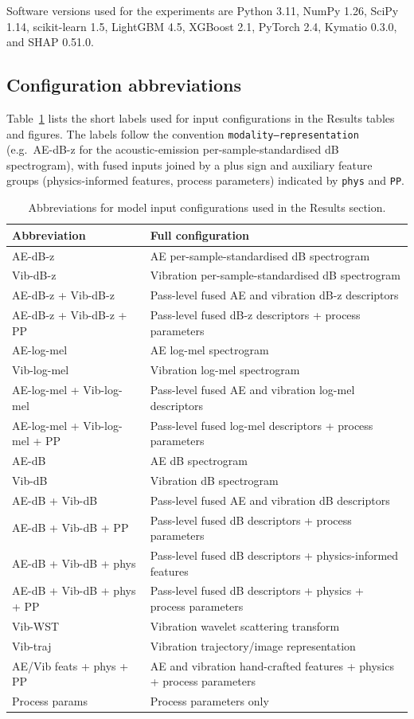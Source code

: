 Software versions used for the experiments are Python 3.11, NumPy 1.26,
SciPy 1.14, scikit-learn 1.5, LightGBM 4.5, XGBoost 2.1, PyTorch 2.4,
Kymatio 0.3.0, and SHAP 0.51.0.

\subsection{Configuration abbreviations}\label{sec:config-abbreviations}

Table~\ref{tbl:config-abbreviations} lists the short labels used for
input configurations in the Results tables and figures. The labels follow
the convention \texttt{modality--representation} (e.g.~AE-dB-z for the
acoustic-emission per-sample-standardised dB spectrogram), with fused inputs joined by a plus
sign and auxiliary feature groups (physics-informed features, process
parameters) indicated by \texttt{phys} and \texttt{PP}.

\begin{table}[htbp]
\centering
\caption{Abbreviations for model input configurations used in the
Results section.}\label{tbl:config-abbreviations}
\begin{tabular}[]{@{}ll@{}}
\toprule
Abbreviation & Full configuration \\
\midrule
AE-dB-z & AE per-sample-standardised dB spectrogram \\
Vib-dB-z & Vibration per-sample-standardised dB spectrogram \\
AE-dB-z + Vib-dB-z & Pass-level fused AE and vibration dB-z descriptors \\
AE-dB-z + Vib-dB-z + PP & Pass-level fused dB-z descriptors + process parameters \\
AE-log-mel & AE log-mel spectrogram \\
Vib-log-mel & Vibration log-mel spectrogram \\
AE-log-mel + Vib-log-mel & Pass-level fused AE and vibration log-mel descriptors \\
AE-log-mel + Vib-log-mel + PP & Pass-level fused log-mel descriptors + process parameters \\
AE-dB & AE dB spectrogram \\
Vib-dB & Vibration dB spectrogram \\
AE-dB + Vib-dB & Pass-level fused AE and vibration dB descriptors \\
AE-dB + Vib-dB + PP & Pass-level fused dB descriptors + process parameters \\
AE-dB + Vib-dB + phys & Pass-level fused dB descriptors + physics-informed features \\
AE-dB + Vib-dB + phys + PP & Pass-level fused dB descriptors + physics + process parameters \\
Vib-WST & Vibration wavelet scattering transform \\
Vib-traj & Vibration trajectory/image representation \\
AE/Vib feats + phys + PP & AE and vibration hand-crafted features + physics + process parameters \\
Process params & Process parameters only \\
\bottomrule
\end{tabular}
\end{table}

